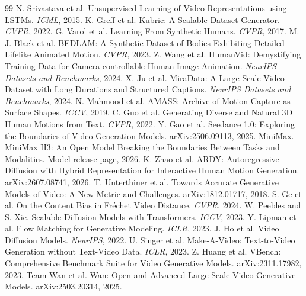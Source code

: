 \documentclass[10pt,twocolumn]{article}
\begin{document}
\begin{thebibliography}{99}\footnotesize
\setlength{\itemsep}{0pt}
\setlength{\parskip}{0pt}
 N. Srivastava et al. Unsupervised Learning of Video Representations using LSTMs. \emph{ICML}, 2015.
 K. Greff et al. Kubric: A Scalable Dataset Generator. \emph{CVPR}, 2022.
 G. Varol et al. Learning From Synthetic Humans. \emph{CVPR}, 2017.
 M. J. Black et al. BEDLAM: A Synthetic Dataset of Bodies Exhibiting Detailed Lifelike Animated Motion. \emph{CVPR}, 2023.
 Z. Wang et al. HumanVid: Demystifying Training Data for Camera-controllable Human Image Animation. \emph{NeurIPS Datasets and Benchmarks}, 2024.
 X. Ju et al. MiraData: A Large-Scale Video Dataset with Long Durations and Structured Captions. \emph{NeurIPS Datasets and Benchmarks}, 2024.
 N. Mahmood et al. AMASS: Archive of Motion Capture as Surface Shapes. \emph{ICCV}, 2019.
 C. Guo et al. Generating Diverse and Natural 3D Human Motions from Text. \emph{CVPR}, 2022.
 Y. Gao et al. Seedance 1.0: Exploring the Boundaries of Video Generation Models. arXiv:2506.09113, 2025.
 MiniMax. MiniMax H3: An Open Model Breaking the Boundaries Between Tasks and Modalities.
\href{https://www.minimax.io/blog/minimax-h3}{Model release page}, 2026.
 K. Zhao et al. ARDY: Autoregressive Diffusion with Hybrid Representation for Interactive Human Motion Generation. arXiv:2607.08741, 2026.
 T. Unterthiner et al. Towards Accurate Generative Models of Video: A New Metric and Challenges. arXiv:1812.01717, 2018.
 S. Ge et al. On the Content Bias in Fr\'echet Video Distance. \emph{CVPR}, 2024.
 W. Peebles and S. Xie. Scalable Diffusion Models with Transformers. \emph{ICCV}, 2023.
 Y. Lipman et al. Flow Matching for Generative Modeling. \emph{ICLR}, 2023.
 J. Ho et al. Video Diffusion Models. \emph{NeurIPS}, 2022.
 U. Singer et al. Make-A-Video: Text-to-Video Generation without Text-Video Data. \emph{ICLR}, 2023.
 Z. Huang et al. VBench: Comprehensive Benchmark Suite for Video Generative Models. arXiv:2311.17982, 2023.
 Team Wan et al. Wan: Open and Advanced Large-Scale Video Generative Models. arXiv:2503.20314, 2025.
\end{thebibliography}
\end{document}
